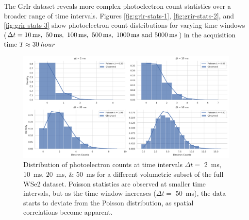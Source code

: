 The \gls{GrIr} dataset reveals more complex photoelectron count statistics over a broader range of time intervals. Figures \ref{fig:grir-stats-1}, \ref{fig:grir-stats-2}, and \ref{fig:grir-stats-3} show photoelectron count distributions for varying time windows ($\Delta t = \qtylist{10;50;100;500;1000;5000}{ms}$) in the acquisition time $T\approx\qty{30}{hour}$


\begin{figure}
    \centering
    \includegraphics[width=1\linewidth]{images/hist_counts_facetgrid_2_wse2.pdf}
    \caption{Distribution of photoelectron counts at time intervals $\Delta t =$ \qtylist{2;10;20;50}{ms} for a different volumetric subset of the full \gls{WSe2} dataset. Poisson statistics are observed at smaller time intervals, but as the time window increases ($\Delta t =$ \qty{50}{ms}), the data starts to deviate from the Poisson distribution, as spatial correlations become apparent.}
    \label{fig:wse2-stats-2}
\end{figure}


